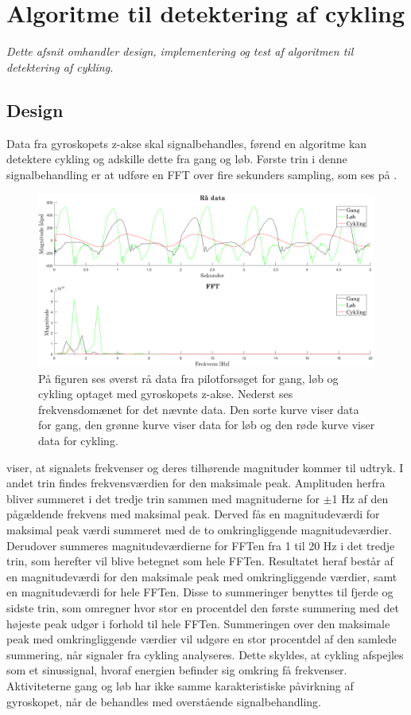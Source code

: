 \section{Algoritme til detektering af cykling}\label{sec:algocykel}
\textit{Dette afsnit omhandler design, implementering og test af algoritmen til detektering af cykling.}  

\subsection{Design}\label{design_cykling}
Data fra gyroskopets z-akse skal signalbehandles, førend en algoritme kan detektere cykling og adskille dette fra gang og løb. Første trin i denne signalbehandling er at udføre en FFT over fire sekunders sampling, som ses på .
\begin{figure}[H]
	\centering
	\includegraphics[scale=0.3]{figures/cDesign/gyro_behandling.png}
	\caption{På figuren ses øverst rå data fra pilotforsøget for gang, løb og cykling optaget med gyroskopets z-akse. Nederst ses frekvensdomænet for det nævnte data. Den sorte kurve viser data for gang, den grønne kurve viser data for løb og den røde kurve viser data for cykling.}
	\label{fig:gyro_behandling}
\end{figure}\vspace{-0.25cm}
 viser, at signalets frekvenser og deres tilhørende magnituder kommer til udtryk. I andet trin findes frekvensværdien for den maksimale peak. Amplituden herfra bliver summeret i det tredje trin sammen med magnituderne for $\pm$1 Hz af den pågældende frekvens med maksimal peak. Derved fås en magnitudeværdi for maksimal peak værdi summeret med de to omkringliggende magnitudeværdier. Derudover summeres magnitudeværdierne for FFTen fra 1 til 20 Hz i det tredje trin, som herefter vil blive betegnet som hele FFTen. Resultatet heraf består af en magnitudeværdi for den maksimale peak med omkringliggende værdier, samt en magnitudeværdi for hele FFTen. Disse to summeringer benyttes til fjerde og sidste trin, som omregner hvor stor en procentdel den første summering med det højeste peak udgør i forhold til hele FFTen. Summeringen over den maksimale peak med omkringliggende værdier vil udgøre en stor procentdel af den samlede summering, når signaler fra cykling analyseres. Dette skyldes, at cykling afspejles som et sinussignal, hvoraf energien befinder sig omkring få frekvenser. Aktiviteterne gang og løb har ikke samme karakteristiske påvirkning af gyroskopet, når de behandles med overstående signalbehandling.

